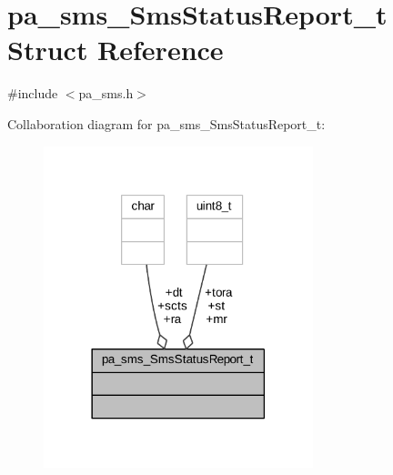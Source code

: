 \hypertarget{structpa__sms___sms_status_report__t}{}\section{pa\+\_\+sms\+\_\+\+Sms\+Status\+Report\+\_\+t Struct Reference}
\label{structpa__sms___sms_status_report__t}


{\ttfamily \#include $<$pa\+\_\+sms.\+h$>$}



Collaboration diagram for pa\+\_\+sms\+\_\+\+Sms\+Status\+Report\+\_\+t\+:
\nopagebreak
\begin{figure}[H]
\begin{center}
\leavevmode
\includegraphics[width=222pt]{structpa__sms___sms_status_report__t__coll__graph}
\end{center}
\end{figure}
